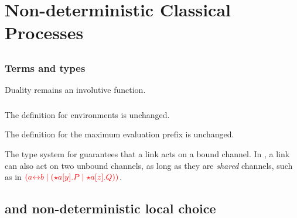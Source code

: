 \chapter{Non-deterministic Classical Processes}\label{sec:main}
\section{\nodcap}
\subsection{Terms and types}



Duality remains an involutive function.

\subsection{}




The definition for environments is unchanged.







The definition for the maximum evaluation prefix is unchanged.

The type system for \cp guarantees that a link acts on a bound channel. In
\nodcap, a link can also act on two unbound channels, as long as they are
\emph{shared} channels, such as in
$\textcolor{red}{(a{\leftrightarrow}b \mid ({\star}{a}[y].P \mid {\star}{a}[z].Q))}$.








\section{\nodcap and non-deterministic local choice}
